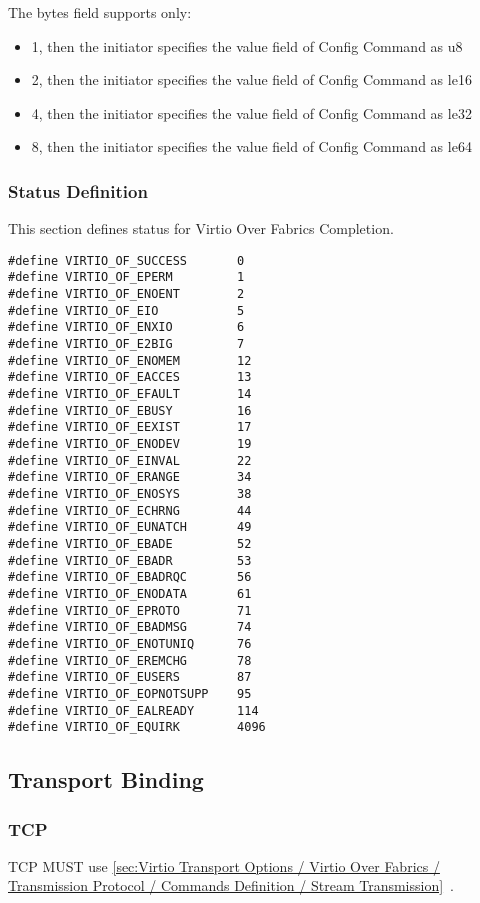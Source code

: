The bytes field supports only:

\begin{itemize}
\item 1, then the initiator specifies the value field of Config Command as u8
\item 2, then the initiator specifies the value field of Config Command as le16
\item 4, then the initiator specifies the value field of Config Command as le32
\item 8, then the initiator specifies the value field of Config Command as le64
\end{itemize}

\subsubsection{Status Definition}\label{sec:Virtio Transport Options / Virtio Over Fabrics / Transmission Protocol / Status Definition}
This section defines status for Virtio Over Fabrics Completion.

\begin{lstlisting}
#define VIRTIO_OF_SUCCESS       0
#define VIRTIO_OF_EPERM         1
#define VIRTIO_OF_ENOENT        2
#define VIRTIO_OF_EIO           5
#define VIRTIO_OF_ENXIO         6
#define VIRTIO_OF_E2BIG         7
#define VIRTIO_OF_ENOMEM        12
#define VIRTIO_OF_EACCES        13
#define VIRTIO_OF_EFAULT        14
#define VIRTIO_OF_EBUSY         16
#define VIRTIO_OF_EEXIST        17
#define VIRTIO_OF_ENODEV        19
#define VIRTIO_OF_EINVAL        22
#define VIRTIO_OF_ERANGE        34
#define VIRTIO_OF_ENOSYS        38
#define VIRTIO_OF_ECHRNG        44
#define VIRTIO_OF_EUNATCH       49
#define VIRTIO_OF_EBADE         52
#define VIRTIO_OF_EBADR         53
#define VIRTIO_OF_EBADRQC       56
#define VIRTIO_OF_ENODATA       61
#define VIRTIO_OF_EPROTO        71
#define VIRTIO_OF_EBADMSG       74
#define VIRTIO_OF_ENOTUNIQ      76
#define VIRTIO_OF_EREMCHG       78
#define VIRTIO_OF_EUSERS        87
#define VIRTIO_OF_EOPNOTSUPP    95
#define VIRTIO_OF_EALREADY      114
#define VIRTIO_OF_EQUIRK        4096
\end{lstlisting}

\subsection{Transport Binding}\label{sec:Virtio Transport Options / Virtio Over Fabrics / Transport Binding}
\subsubsection{TCP}\label{sec:Virtio Transport Options / Virtio Over Fabrics / ransport Binding / TCP}
TCP MUST use \ref{sec:Virtio Transport Options / Virtio Over Fabrics / Transmission Protocol / Commands Definition / Stream Transmission}~.

